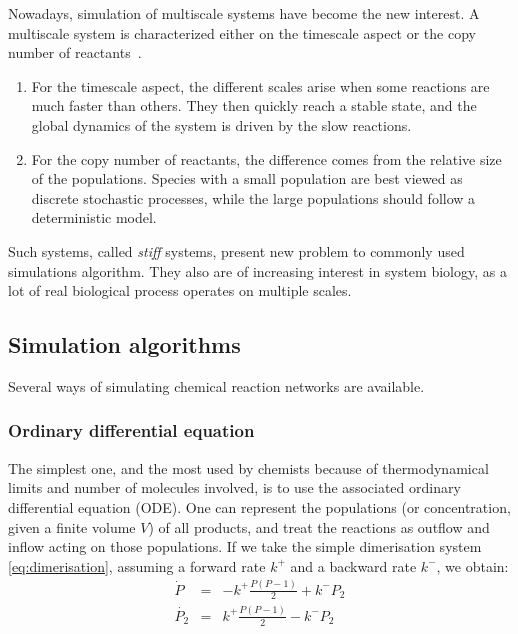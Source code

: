 	Nowadays, simulation of multiscale systems have become the new interest. A multiscale system is characterized either on the timescale aspect or the copy number of reactants~\cite{Cao:2008p5942}.
	\begin{enumerate}
		\item For the timescale aspect, the different scales arise when some reactions are much faster than others. They then quickly reach a stable state, and the global dynamics of the system is driven by the slow reactions.
		\item For the copy number of reactants, the difference comes from the relative size of the populations. Species with a small population are best viewed as discrete stochastic processes, while the large populations should follow a deterministic model. 
	\end{enumerate}
	Such systems, called \textit{stiff} systems, present new problem to commonly used simulations algorithm. They also are of increasing interest in system biology, as a lot of real biological process operates on multiple scales.
	
	
	\subsection{Simulation algorithms} %
	\label{sub:simulation_algorithms}
	
		Several ways of simulating chemical reaction networks are available.
		
		\subsubsection{Ordinary differential equation} %
		\label{ssub:ordinary_differential_equation}
		
		The simplest one, and the most used by chemists because of thermodynamical limits and number of molecules involved, is to use the associated ordinary differential equation (ODE). One can represent the populations (or concentration, given a finite volume $V$) of all products, and treat the reactions as outflow and inflow acting on those populations. If we take the simple dimerisation system \eqref{eq:dimerisation}, assuming a forward rate $k^+$ and a backward rate $k^-$, we obtain:
		\begin{eqnarray}
			\dot{P} & = & -k^+\frac{P(P-1)}{2} + k^-P_2 \\
			\dot{P_2} & = & k^+\frac{P(P-1)}{2} - k^-P_2
		\end{eqnarray}
		
